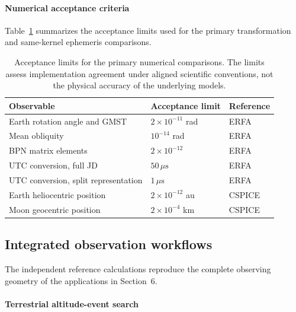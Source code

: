 \paragraph{Numerical acceptance criteria}

Table~\ref{tab:method-tolerances} summarizes the acceptance limits used for the primary
transformation and same-kernel ephemeris comparisons.

\begin{table}[!tbp]
    \centering
    \caption{Acceptance limits for the primary
        numerical comparisons. The limits assess
        implementation agreement under aligned
        scientific conventions, not the physical
        accuracy of the underlying models.}
    \label{tab:method-tolerances}
    \footnotesize
    \begin{tabular}{@{}lll@{}}
        \toprule
        Observable & Acceptance limit      & Reference \\
        \midrule
        Earth rotation angle and GMST
                   & $2\times10^{-11}$ rad & ERFA      \\
        Mean obliquity
                   & $10^{-14}$ rad        & ERFA      \\
        BPN matrix elements
                   & $2\times10^{-12}$     & ERFA      \\
        UTC conversion, full JD
                   & $50\,\mu\mathrm{s}$   & ERFA      \\
        UTC conversion, split representation
                   & $1\,\mu\mathrm{s}$    & ERFA      \\
        Earth heliocentric position
                   & $2\times10^{-12}$ au  & CSPICE    \\
        Moon geocentric position
                   & $2\times10^{-4}$ km   & CSPICE    \\
        \bottomrule
    \end{tabular}
\end{table}

\subsection{Integrated observation workflows}
\label{sec:observation-method}

The independent reference calculations reproduce the complete observing geometry of the
applications in Section~6.

\paragraph{Terrestrial altitude-event search}

